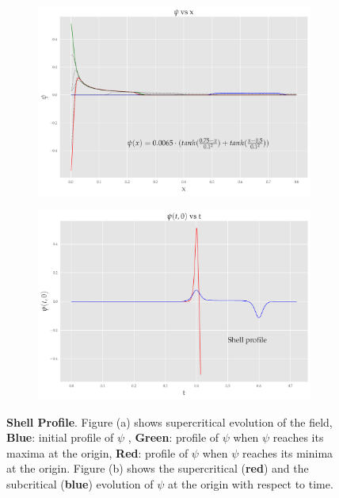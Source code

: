 \begin{figure}
    \centering
    \begin{subfigure}[b]{0.85\textwidth}
        \includegraphics[width=1\linewidth]{images/super_shell.pdf}
        \caption{}
        \label{fig:shell}
    \end{subfigure}

    \begin{subfigure}[b]{0.85\textwidth}
        \includegraphics[width=1\linewidth]{images/at0_shell.pdf}
        \caption{}
        \label{fig:at0_shell}
    \end{subfigure}
    \caption[Evolution of $\psi$ from an initial shell profile]{\textbf{Shell Profile}. Figure (a) shows supercritical evolution of the field, \textbf{Blue}: initial profile of $\psi$ , \textbf{Green}: profile of $\psi$ when $\psi$ reaches its maxima at the origin, \textbf{Red}: profile of $\psi$ when $\psi$ reaches its minima at the origin. Figure (b) shows the supercritical (\textbf{red}) and the subcritical (\textbf{blue}) evolution of $\psi$ at the origin with respect to time.}
\end{figure}
